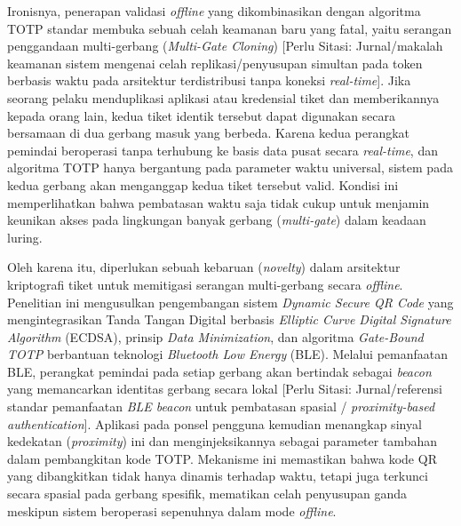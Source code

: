 Ironisnya, penerapan validasi \textit{offline} yang dikombinasikan dengan algoritma TOTP standar membuka sebuah celah keamanan baru yang fatal, yaitu serangan penggandaan multi-gerbang (\textit{Multi-Gate Cloning}) [Perlu Sitasi: Jurnal/makalah keamanan sistem mengenai celah replikasi/penyusupan simultan pada token berbasis waktu pada arsitektur terdistribusi tanpa koneksi \textit{real-time}]. Jika seorang pelaku menduplikasi aplikasi atau kredensial tiket dan memberikannya kepada orang lain, kedua tiket identik tersebut dapat digunakan secara bersamaan di dua gerbang masuk yang berbeda. Karena kedua perangkat pemindai beroperasi tanpa terhubung ke basis data pusat secara \textit{real-time}, dan algoritma TOTP hanya bergantung pada parameter waktu universal, sistem pada kedua gerbang akan menganggap kedua tiket tersebut valid. Kondisi ini memperlihatkan bahwa pembatasan waktu saja tidak cukup untuk menjamin keunikan akses pada lingkungan banyak gerbang (\textit{multi-gate}) dalam keadaan luring.

Oleh karena itu, diperlukan sebuah kebaruan (\textit{novelty}) dalam arsitektur kriptografi tiket untuk memitigasi serangan multi-gerbang secara \textit{offline}. Penelitian ini mengusulkan pengembangan sistem \textit{Dynamic Secure QR Code} yang mengintegrasikan Tanda Tangan Digital berbasis \textit{Elliptic Curve Digital Signature Algorithm} (ECDSA), prinsip \textit{Data Minimization}, dan algoritma \textit{Gate-Bound TOTP} berbantuan teknologi \textit{Bluetooth Low Energy} (BLE). Melalui pemanfaatan BLE, perangkat pemindai pada setiap gerbang akan bertindak sebagai \textit{beacon} yang memancarkan identitas gerbang secara lokal [Perlu Sitasi: Jurnal/referensi standar pemanfaatan \textit{BLE beacon} untuk pembatasan spasial / \textit{proximity-based authentication}]. Aplikasi pada ponsel pengguna kemudian menangkap sinyal kedekatan (\textit{proximity}) ini dan menginjeksikannya sebagai parameter tambahan dalam pembangkitan kode TOTP. Mekanisme ini memastikan bahwa kode QR yang dibangkitkan tidak hanya dinamis terhadap waktu, tetapi juga terkunci secara spasial pada gerbang spesifik, mematikan celah penyusupan ganda meskipun sistem beroperasi sepenuhnya dalam mode \textit{offline}.

